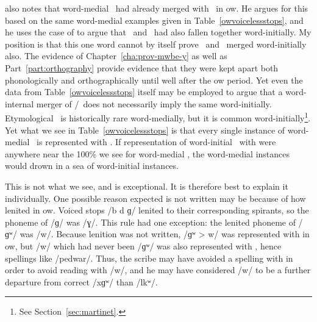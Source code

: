 \Textcite{Sch_Two01} also notes that word-medial \xD\ had already merged with \lT\ in \gls{ow}. He argues for this based on the same word-medial examples given in Table~\ref{owvoicelessstops}, and he uses the case of  to argue that \lT\ and \xD\ had also fallen together word-initially. My position is that this one word cannot by itself prove  \xD\ and \lT\ merged word-initially also. The evidence of Chapter~\ref{cha:prov-mwbe-y} as well as Part~\ref{part:orthography} provide evidence that they were kept apart both phonologically and orthographically until well after the \gls{ow} period. Yet even the data from Table~\ref{owvoicelessstops} itself may be employed to argue that a word-internal merger of \xD/\lT\ does not necessarily imply the same word-initially. Etymological \xD\ is historically rare word-medially, but it is common word-initially\footnote{See Section~\ref{sec:martinet}.}. Yet what we see in Table~\ref{owvoicelessstops} is that every single instance of word-medial \xD\ is represented with . If representation of word-initial \xD\ with  were anywhere near the 100\% we see for word-medial \xD, the word-medial instances would drown in a sea of word-initial instances. 

This is not what we see, and  is exceptional. It is therefore best to explain it individually. One possible reason expected  is not written may be because of how  lenited in \gls{ow}. Voiced stops /b d ɡ/ lenited to their corresponding spirants, so the phoneme of /ɡ/ was /ɣ/. This rule had one exception: the lenited phoneme of /ɡʷ/ was /w/. Because lenition was not written, /ɡʷ > w/ was represented with  in \gls{ow}, but /w/ which had never been /ɡʷ/ was also represented with , hence spellings like  /pedwar/. Thus, the scribe may have avoided a spelling with  in order to avoid reading with /w/, and he may have considered /w/ to be a further departure from correct /\gls{x}ɡʷ/ than /\gls{l}kʷ/.






